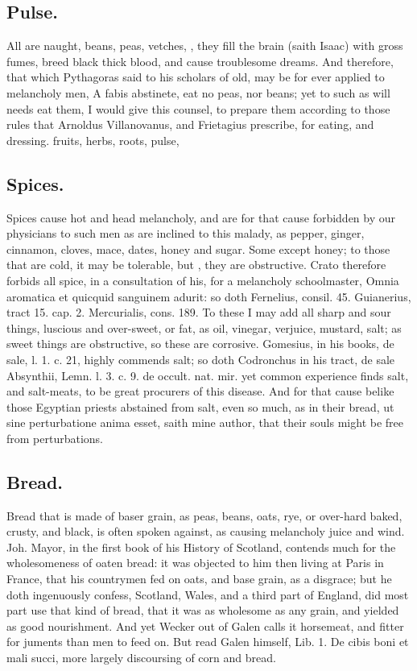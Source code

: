 {{\subsection{Pulse.}
All  are naught, beans, peas, vetches, \etc{}, they fill
the brain (saith Isaac) with gross fumes, breed black thick blood, and
cause troublesome dreams. And therefore, that which Pythagoras said to
his scholars of old, may be for ever applied to melancholy men, A fabis
abstinete, eat no peas, nor beans; yet to such as will needs eat them,
I would give this counsel, to prepare them according to those rules
that Arnoldus Villanovanus, and Frietagius prescribe, for eating, and
dressing. fruits, herbs, roots, pulse, \etc{}

\subsection{Spices.}
Spices cause hot and head melancholy, and are for that cause
forbidden by our physicians to such men as are inclined to this malady,
as pepper, ginger, cinnamon, cloves, mace, dates, \etc{} honey and sugar.
 Some except honey; to those that are cold, it may be tolerable,
but  , they
are obstructive. Crato therefore forbids all spice, in a consultation
of his, for a melancholy schoolmaster, Omnia aromatica et quicquid
sanguinem adurit: so doth Fernelius, consil. 45. Guianerius, tract 15.
cap. 2. Mercurialis, cons. 189. To these I may add all sharp and sour
things, luscious and over-sweet, or fat, as oil, vinegar, verjuice,
mustard, salt; as sweet things are obstructive, so these are corrosive.
Gomesius, in his books, de sale, l. 1. c. 21, highly commends salt; so
doth Codronchus in his tract, de sale Absynthii, Lemn. l. 3. c. 9. de
occult. nat. mir. yet common experience finds salt, and salt-meats, to
be great procurers of this disease. And for that cause belike those
Egyptian priests abstained from salt, even so much, as in their bread,
ut sine perturbatione anima esset, saith mine author, that their souls
might be free from perturbations.

\subsection{Bread.}
Bread that is made of baser grain, as peas, beans, oats, rye,
or over-hard baked, crusty, and black, is often spoken against,
as causing melancholy juice and wind. Joh. Mayor, in the first book of
his History of Scotland, contends much for the wholesomeness of oaten
bread: it was objected to him then living at Paris in France, that his
countrymen fed on oats, and base grain, as a disgrace; but he doth
ingenuously confess, Scotland, Wales, and a third part of England, did
most part use that kind of bread, that it was as wholesome as any
grain, and yielded as good nourishment. And yet Wecker out of Galen
calls it horsemeat, and fitter for juments than men to feed on. But
read Galen himself, Lib. 1. De cibis boni et mali succi, more largely
discoursing of corn and bread.

}}
